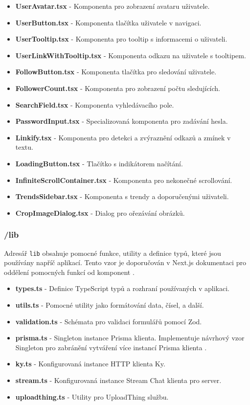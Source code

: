 \documentclass[12pt]{article}
\begin{document}
\begin{itemize}
  \item \textbf{UserAvatar.tsx} - Komponenta pro zobrazení avataru uživatele.
  \item \textbf{UserButton.tsx} - Komponenta tlačítka uživatele v navigaci.
  \item \textbf{UserTooltip.tsx} - Komponenta pro tooltip s informacemi o uživateli.
  \item \textbf{UserLinkWithTooltip.tsx} - Komponenta odkazu na uživatele s tooltipem.
  \item \textbf{FollowButton.tsx} - Komponenta tlačítka pro sledování uživatele.
  \item \textbf{FollowerCount.tsx} - Komponenta pro zobrazení počtu sledujících.
  \item \textbf{SearchField.tsx} - Komponenta vyhledávacího pole.
  \item \textbf{PasswordInput.tsx} - Specializovaná komponenta pro zadávání hesla.
  \item \textbf{Linkify.tsx} - Komponenta pro detekci a zvýraznění odkazů a zmínek v textu.
  \item \textbf{LoadingButton.tsx} - Tlačítko s indikátorem načítání.
  \item \textbf{InfiniteScrollContainer.tsx} - Komponenta pro nekonečné scrollování.
  \item \textbf{TrendsSidebar.tsx} - Komponenta s trendy a doporučenými uživateli.
  \item \textbf{CropImageDialog.tsx} - Dialog pro ořezávání obrázků.
\end{itemize}

\subsubsection{/lib}

Adresář \texttt{lib} obsahuje pomocné funkce, utility a definice typů, které jsou používány napříč aplikací. Tento vzor je doporučován v Next.js dokumentaci pro oddělení pomocných funkcí od komponent \citep{Vercel2023ProjectOrganization}.

\begin{itemize}
  \item \textbf{types.ts} - Definice TypeScript typů a rozhraní používaných v aplikaci.
  \item \textbf{utils.ts} - Pomocné utility jako formátování data, čísel, a další.
  \item \textbf{validation.ts} - Schémata pro validaci formulářů pomocí Zod.
  \item \textbf{prisma.ts} - Singleton instance Prisma klienta. Implementuje návrhový vzor Singleton pro zabránění vytváření více instancí Prisma klienta \citep{Prisma2023}.
  \item \textbf{ky.ts} - Konfigurovaná instance HTTP klienta Ky.
  \item \textbf{stream.ts} - Konfigurovaná instance Stream Chat klienta pro server.
  \item \textbf{uploadthing.ts} - Utility pro UploadThing službu.
\end{itemize}
\end{document}
